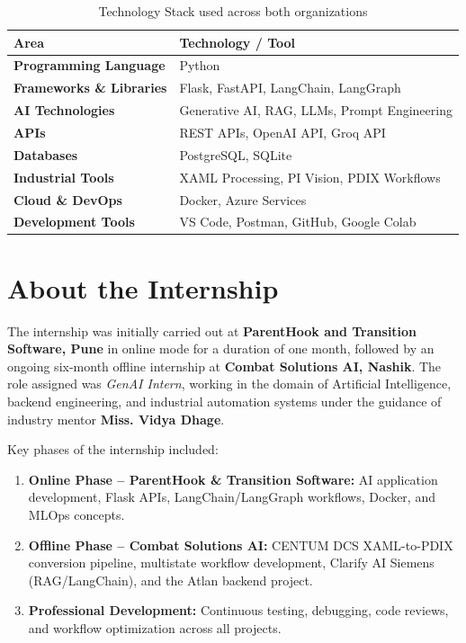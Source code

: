 \documentclass[12pt,a4paper]{report}
\begin{document}
\begin{table}[H]
\centering
\caption{Technology Stack used across both organizations}
\begin{tabular}{>{\bfseries}p{4cm} p{8cm}}
\toprule
\textbf{Area} & \textbf{Technology / Tool} \\
\midrule
Programming Language & Python \\
Frameworks \& Libraries & Flask, FastAPI, LangChain, LangGraph \\
AI Technologies & Generative AI, RAG, LLMs, Prompt Engineering \\
APIs & REST APIs, OpenAI API, Groq API \\
Databases & PostgreSQL, SQLite \\
Industrial Tools & XAML Processing, PI Vision, PDIX Workflows \\
Cloud \& DevOps & Docker, Azure Services \\
Development Tools & VS Code, Postman, GitHub, Google Colab \\
\bottomrule
\end{tabular}
\label{tab:techstack}
\end{table}

\section{About the Internship}

The internship was initially carried out at \textbf{ParentHook and Transition Software, Pune} in online mode for a duration of one month, followed by an ongoing six-month offline internship at \textbf{Combat Solutions AI, Nashik}. The role assigned was \textit{GenAI Intern}, working in the domain of Artificial Intelligence, backend engineering, and industrial automation systems under the guidance of industry mentor \textbf{Miss. Vidya Dhage}.

Key phases of the internship included:
\begin{enumerate}[leftmargin=1.5cm]
    \item \textbf{Online Phase -- ParentHook \& Transition Software:} AI application development, Flask APIs, LangChain/LangGraph workflows, Docker, and MLOps concepts.
    \item \textbf{Offline Phase -- Combat Solutions AI:} CENTUM DCS XAML-to-PDIX conversion pipeline, multistate workflow development, Clarify AI Siemens (RAG/LangChain), and the Atlan backend project.
    \item \textbf{Professional Development:} Continuous testing, debugging, code reviews, and workflow optimization across all projects.
\end{enumerate}
\end{document}
